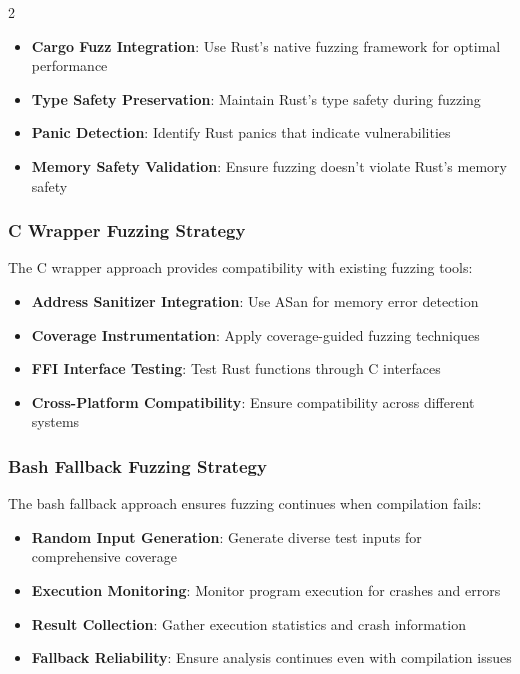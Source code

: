 \documentclass[12pt,a4paper]{article}
\begin{document}
\begin{multicols}{2}
\begin{itemize}
    \item \textbf{Cargo Fuzz Integration}: Use Rust's native fuzzing framework for optimal performance
    \item \textbf{Type Safety Preservation}: Maintain Rust's type safety during fuzzing
    \item \textbf{Panic Detection}: Identify Rust panics that indicate vulnerabilities
    \item \textbf{Memory Safety Validation}: Ensure fuzzing doesn't violate Rust's memory safety
\end{itemize}

\subsubsection{C Wrapper Fuzzing Strategy}

The C wrapper approach provides compatibility with existing fuzzing tools:

\begin{itemize}
    \item \textbf{Address Sanitizer Integration}: Use ASan for memory error detection
    \item \textbf{Coverage Instrumentation}: Apply coverage-guided fuzzing techniques
    \item \textbf{FFI Interface Testing}: Test Rust functions through C interfaces
    \item \textbf{Cross-Platform Compatibility}: Ensure compatibility across different systems
\end{itemize}

\subsubsection{Bash Fallback Fuzzing Strategy}

The bash fallback approach ensures fuzzing continues when compilation fails:

\begin{itemize}
    \item \textbf{Random Input Generation}: Generate diverse test inputs for comprehensive coverage
    \item \textbf{Execution Monitoring}: Monitor program execution for crashes and errors
    \item \textbf{Result Collection}: Gather execution statistics and crash information
    \item \textbf{Fallback Reliability}: Ensure analysis continues even with compilation issues
\end{itemize}


\end{multicols}
\end{document}
